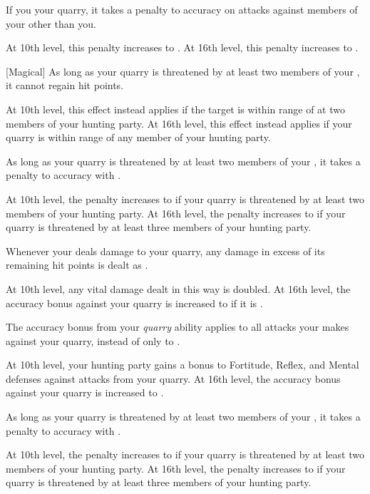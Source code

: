 {            
            If you  your quarry, it takes a  penalty to accuracy on attacks against members of your  other than you.
            \par At 10th level, this penalty increases to .
            At 16th level, this penalty increases to .

            [Magical]
            As long as your quarry is threatened by at least two members of your , it cannot regain hit points.
            \par At 10th level, this effect instead applies if the target is within \rngmed range of at two members of your hunting party.
            At 16th level, this effect instead applies if your quarry is within \rnglong range of any member of your hunting party.

            As long as your quarry is threatened by at least two members of your , it takes a  penalty to accuracy with .
            \par At 10th level, the penalty increases to  if your quarry is threatened by at least two members of your hunting party.
            At 16th level, the penalty increases to  if your quarry is threatened by at least three members of your hunting party.

            Whenever your  deals damage to your quarry, any damage in excess of its remaining hit points is dealt as .
            \par At 10th level, any vital damage dealt in this way is doubled.
            At 16th level, the accuracy bonus against your quarry is increased to  if it is .

            The accuracy bonus from your \textit{quarry} ability applies to all attacks your  makes against your quarry, instead of only to .
            \par At 10th level, your hunting party gains a  bonus to Fortitude, Reflex, and Mental defenses against attacks from your quarry.
            At 16th level, the accuracy bonus against your quarry is increased to .

            As long as your quarry is threatened by at least two members of your , it takes a  penalty to accuracy with .
            \par At 10th level, the penalty increases to  if your quarry is threatened by at least two members of your hunting party.
            At 16th level, the penalty increases to  if your quarry is threatened by at least three members of your hunting party.

}
